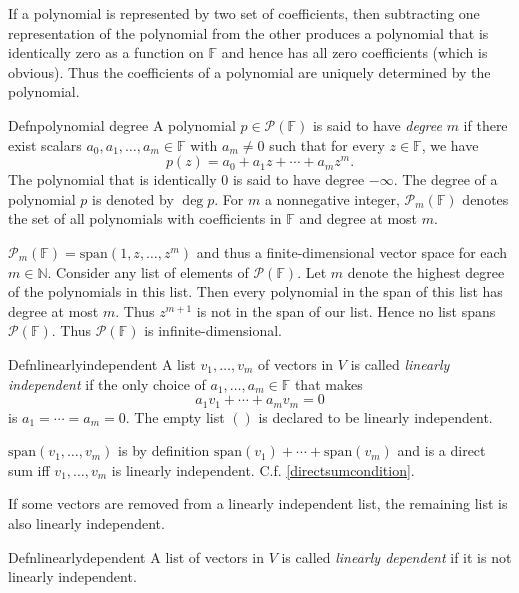 If a polynomial is represented by two set of coefficients, then subtracting one representation of the polynomial from the other produces a polynomial that is identically zero as a function on $\mathbb F$ and hence has all zero coefficients (which is obvious). Thus the coefficients of a polynomial are uniquely determined by the polynomial.

\begin{reference}{Defn}{polynomial degree}
  A polynomial \( p \in \mathcal{P}(\mathbb{F}) \) is said to have \textit{degree} \( m \) if there exist scalars
  \( a_0, a_1, \ldots, a_m \in \mathbb{F} \) with \( a_m \ne 0 \) such that for every \( z \in \mathbb{F} \), we have
  \[
    p(z) = a_0 + a_1 z + \cdots + a_m z^m.
  \]
  The polynomial that is identically \( 0 \) is said to have degree \( -\infty \). The degree of a polynomial \( p \) is denoted by \( \deg p \). For $m$ a nonnegative integer, $\mathcal P_m(\mathbb F)$ denotes the set of all polynomials with coefficients in $\mathbb F$ and degree at most $m$.
\end{reference}

$\mathcal P_m(\mathbb F)=\mathrm{span}(1,z,\dots,z^m)$ and thus a finite-dimensional vector space for each $m\in \mathbb N$. Consider any list of elements of \( \mathcal{P}(\mathbb{F}) \). Let \( m \) denote the highest degree of the polynomials in this list. Then every polynomial in the span of this list has degree at most \( m \). Thus \( z^{m+1} \) is not in the span of our list. Hence no list spans \( \mathcal{P}(\mathbb{F}) \). Thus \( \mathcal{P}(\mathbb{F}) \) is infinite-dimensional.

\begin{reference}{Defn}{linearlyindependent}
  A list $v_1,\dots,v_m$ of vectors in $V$ is called \textit{linearly independent} if the only choice of $a_1,\dots,a_m\in \mathbb F$ that makes
  \[
    a_1v_1+\cdots+a_mv_m=0
  \]
  is $a_1=\cdots=a_m=0$. The empty list $()$ is declared to be linearly independent.
\end{reference}

$\mathrm{span}(v_1,\dots,v_m)$ is by definition $\mathrm{span}(v_1)+\cdots+ \mathrm{span}(v_m)$ and is a direct sum iff $v_1,\dots,v_m$ is linearly independent. C.f. \ref{directsumcondition}.

If some vectors are removed from a linearly independent list, the remaining list is also linearly independent.

\begin{reference}{Defn}{linearlydependent}
  A list of vectors in $V$ is called \textit{linearly dependent} if it is not linearly independent.
\end{reference}

